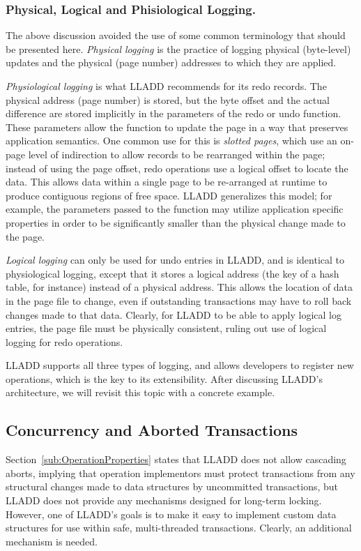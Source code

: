 \documentclass[letterpaper,english]{article}
\begin{document}
\begin{enumerate}
\begin{enumerate}
\begin{enumerate}
\subsubsection{Physical, Logical and Phisiological Logging.}

The above discussion avoided the use of some common terminology 
that should be presented here. {\em Physical logging } 
is the practice of logging physical (byte-level) updates
and the physical (page number) addresses to which they are applied.

{\em Physiological logging } is what LLADD recommends for its redo 
records. The physical address (page number) is stored, but the byte offset
and the actual difference are stored implicitly in the parameters
of the redo or undo function. These parameters allow the function to 
update the page in a way that preserves application semantics.
One common use for this is {\em slotted pages}, which use an on-page level of 
indirection to allow records to be rearranged within the page; instead of using the page offset, redo 
operations use a logical offset to locate the data. This allows data within
a single page to be re-arranged at runtime to produce contiguous
regions of free space. LLADD generalizes this model; for example, the parameters passed to the function may utilize application specific properties in order to be significantly smaller than the physical change made to the page.~\cite{physiological}

{\em Logical logging } can only be used for undo entries in LLADD,
and is identical to physiological logging, except that it stores a
logical address (the key of a hash table, for instance) instead of
a physical address. This allows the location of data in the page file
to change, even if outstanding transactions may have to roll back
changes made to that data. Clearly, for LLADD to be able to apply
logical log entries, the page file must be physically consistent,
ruling out use of logical logging for redo operations.

LLADD supports all three types of logging, and allows developers to
register new operations, which is the key to its extensibility. After
discussing LLADD's architecture, we will revisit this topic with a
concrete example.


\subsection{Concurrency and Aborted Transactions}

Section~\ref{sub:OperationProperties} states that LLADD does not
allow cascading aborts, implying that operation implementors must
protect transactions from any structural changes made to data structures
by uncommitted transactions, but LLADD does not provide any mechanisms
designed for long-term locking. However, one of LLADD's goals is to
make it easy to implement custom data structures for use within safe,
multi-threaded transactions. Clearly, an additional mechanism is needed.


\end{enumerate}
\end{enumerate}
\end{enumerate}
\end{document}
